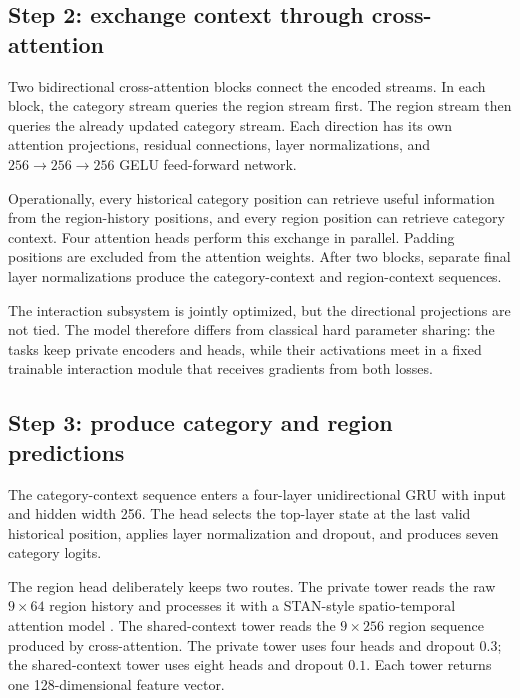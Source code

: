 \subsection{Step 2: exchange context through cross-attention}

Two bidirectional cross-attention blocks connect the encoded streams. In each
block, the category stream queries the region stream first. The region stream then
queries the already updated category stream. Each direction has its own attention
projections, residual connections, layer normalizations, and
$256\rightarrow256\rightarrow256$ GELU feed-forward network.

Operationally, every historical category position can retrieve useful information
from the region-history positions, and every region position can retrieve category
context. Four attention heads perform this exchange in parallel. Padding positions
are excluded from the attention weights. After two blocks, separate final layer
normalizations produce the category-context and region-context sequences.

The interaction subsystem is jointly optimized, but the directional projections
are not tied. The model therefore differs from classical hard parameter sharing:
the tasks keep private encoders and heads, while their activations meet in a fixed
trainable interaction module that receives gradients from both losses.

\subsection{Step 3: produce category and region predictions}

The category-context sequence enters a four-layer unidirectional GRU with input and
hidden width 256. The head selects the top-layer state at the last valid historical
position, applies layer normalization and dropout, and produces seven category
logits.

The region head deliberately keeps two routes. The private tower reads the raw
$9\times64$ region history and processes it with a STAN-style spatio-temporal
attention model \cite{luo2021stan}. The shared-context tower reads the
$9\times256$ region sequence produced by cross-attention. The private tower uses
four heads and dropout $0.3$; the shared-context tower uses eight heads and dropout
$0.1$. Each tower returns one 128-dimensional feature vector.

